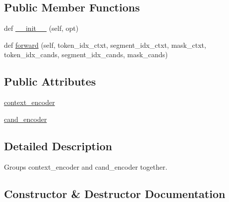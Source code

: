 \subsection*{Public Member Functions}
\begin{DoxyCompactItemize}
\item 
def \hyperlink{classparlai_1_1agents_1_1bert__ranker_1_1bi__encoder__ranker_1_1BiEncoderModule_a81f376495538cf4d413cd9b63184d045}{\+\_\+\+\_\+init\+\_\+\+\_\+} (self, opt)
\item 
def \hyperlink{classparlai_1_1agents_1_1bert__ranker_1_1bi__encoder__ranker_1_1BiEncoderModule_a74b6c842e6e99d8a86f669e385ae48e9}{forward} (self, token\+\_\+idx\+\_\+ctxt, segment\+\_\+idx\+\_\+ctxt, mask\+\_\+ctxt, token\+\_\+idx\+\_\+cands, segment\+\_\+idx\+\_\+cands, mask\+\_\+cands)
\end{DoxyCompactItemize}
\subsection*{Public Attributes}
\begin{DoxyCompactItemize}
\item 
\hyperlink{classparlai_1_1agents_1_1bert__ranker_1_1bi__encoder__ranker_1_1BiEncoderModule_aa92bf5d244fe4f11ea2211353d7aad6f}{context\+\_\+encoder}
\item 
\hyperlink{classparlai_1_1agents_1_1bert__ranker_1_1bi__encoder__ranker_1_1BiEncoderModule_a719af14e2b84f3a52eec12b94ff0c35f}{cand\+\_\+encoder}
\end{DoxyCompactItemize}


\subsection{Detailed Description}
\begin{DoxyVerb}Groups context_encoder and cand_encoder together.
\end{DoxyVerb}
 

\subsection{Constructor \& Destructor Documentation}
\mbox{\label{classparlai_1_1agents_1_1bert__ranker_1_1bi__encoder__ranker_1_1BiEncoderModule_a81f376495538cf4d413cd9b63184d045}} 
